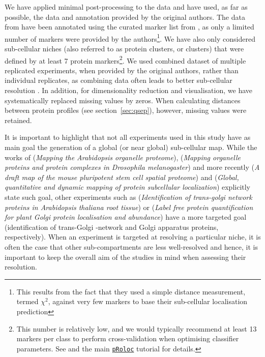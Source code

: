 \documentclass[12pt]{article}\usepackage[]{graphicx}\usepackage[]{color}
\newcommand{\Rpackage}[1]{\texttt{#1}}
\newcommand\Biocpkg[1]{%
  {\href{http://bioconductor.org/packages/#1}%
    {\Rpackage{#1}}}}
\begin{document}
We have applied minimal post-processing to the data and have used, as
far as possible, the data and annotation provided by the original
authors. The data from \citet{Foster:2006} have been annotated using
the curated marker list from \citet{Christoforou:2016}, as only a
limited number of markers were provided by the authors\footnote{This
  results from the fact that they used a simple distance measurement,
  termed $\chi^2$, against very few markers to base their sub-cellular
  localisation prediction}. We have also only considered sub-cellular
niches (also referred to as protein clusters, or clusters) that were
defined by at least 7 protein markers\footnote{This number is
  relatively low, and we would typically recommend at least 13 markers
  per class to perform cross-validation when optimising classifier
  parameters. See \citet{Gatto:2014} and the main \Biocpkg{pRoloc}
  tutorial for details.}. We used combined dataset of multiple
replicated experiments, when provided by the original authors, rather
than individual replicates, as combining data often leads to better
sub-cellular resolution \citep{Trotter:2010}.  In addition, for
dimensionality reduction and visualisation, we have systematically
replaced missing values by zeros. When calculating distances between
protein profiles (see section~\ref{sec:qsep}), however, missing values
were retained.






It is important to highlight that not all experiments used in this
study have as main goal the generation of a global (or near global)
sub-cellular map. While the works of \citet{Dunkley:2006}
(\textit{Mapping the Arabidopsis organelle proteome}),
\citet{Tan:2009} (\textit{Mapping organelle proteins and protein
  complexes in Drosophila melanogaster}) and more recently
\citet{Christoforou:2016} (\textit{A draft map of the mouse
  pluripotent stem cell spatial proteome}) and \citet{Itzhak:2016}
(\textit{Global, quantitative and dynamic mapping of protein
  subcellular localization}) explicitly state such goal, other
experiments such as \citet{Groen:2014} (\textit{Identification of
  trans-golgi network proteins in Arabidopsis thaliana root tissue})
or \citet{Nikolovski:2014} (\textit{Label free protein quantification
  for plant Golgi protein localisation and abundance}) have a
more targeted goal (identification of trans-Golgi -network and Golgi
apparatus proteins, respectively). When an experiment is targeted at
resolving a particular niche, it is often the case that other
sub-compartments are less well-resolved and hence, it is important to
keep the overall aim of the studies in mind when assessing their
resolution.
\end{document}

